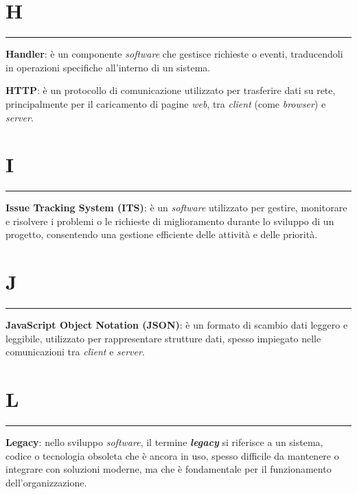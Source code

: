 \section*{H}
{\color{lightgray}\rule{\textwidth}{0.4pt}} %
\begin{glossaryitemize}
    \item \textbf{Handler}: è un componente \textit{software} che gestisce richieste o eventi, traducendoli in operazioni specifiche all’interno di un sistema.
    \item \textbf{HTTP}: è un protocollo di comunicazione utilizzato per trasferire dati su rete, principalmente per il caricamento di pagine \textit{web}, tra \textit{client} (come \textit{browser}) e \textit{server}.
\end{glossaryitemize}

\section*{I}
{\color{lightgray}\rule{\textwidth}{0.4pt}} %
\begin{glossaryitemize}
    \item \textbf{Issue Tracking System (ITS)}: è un \textit{software} utilizzato per gestire, monitorare e risolvere i problemi o le richieste di miglioramento durante lo sviluppo di un progetto, consentendo una gestione efficiente delle attività e delle priorità.
\end{glossaryitemize}

\section*{J}
{\color{lightgray}\rule{\textwidth}{0.4pt}} %
\begin{glossaryitemize}
    \item \textbf{JavaScript Object Notation (JSON)}: è un formato di scambio dati leggero e leggibile, utilizzato per rappresentare strutture dati, spesso impiegato nelle comunicazioni tra \textit{client} e \textit{server}.
\end{glossaryitemize}

\section*{L}
{\color{lightgray}\rule{\textwidth}{0.4pt}} %
\begin{glossaryitemize}
    \item \textbf{Legacy}: nello sviluppo \textit{software}, il termine \textit{\textbf{legacy}} si riferisce a un sistema, codice o tecnologia obsoleta che è ancora in uso, spesso difficile da mantenere o integrare con soluzioni moderne, ma che è fondamentale per il funzionamento dell'organizzazione.
\end{glossaryitemize}


